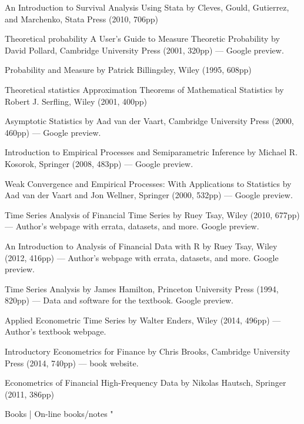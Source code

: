 An Introduction to Survival Analysis Using Stata by Cleves, Gould, Gutierrez, and Marchenko, Stata Press (2010, 706pp)

Theoretical probability
A User's Guide to Measure Theoretic Probability by David Pollard, Cambridge University Press (2001, 320pp) --- Google preview.

Probability and Measure by Patrick Billingsley, Wiley (1995, 608pp)

Theoretical statistics
Approximation Theorems of Mathematical Statistics by Robert J. Serfling, Wiley (2001, 400pp)

Asymptotic Statistics by Aad van der Vaart, Cambridge University Press (2000, 460pp) --- Google preview.

Introduction to Empirical Processes and Semiparametric Inference by Michael R. Kosorok, Springer (2008, 483pp) --- Google preview.

Weak Convergence and Empirical Processes: With Applications to Statistics by Aad van der Vaart and Jon Wellner, Springer (2000, 532pp) --- Google preview.

Time Series
Analysis of Financial Time Series by Ruey Tsay, Wiley (2010, 677pp) --- Author's webpage with errata, datasets, and more.  Google preview.

An Introduction to Analysis of Financial Data with R by Ruey Tsay, Wiley (2012, 416pp) --- Author's webpage with errata, datasets, and more.  Google preview.

Time Series Analysis by James Hamilton, Princeton University Press (1994, 820pp) --- Data and software for the textbook.  Google preview.

Applied Econometric Time Series by Walter Enders, Wiley (2014, 496pp) --- Author's textbook webpage.

Introductory Econometrics for Finance by Chris Brooks, Cambridge University Press (2014, 740pp) --- book website.

Econometrics of Financial High-Frequency Data by Nikolas Hautsch, Springer (2011, 386pp)

 

Books | On-line books/notes
"